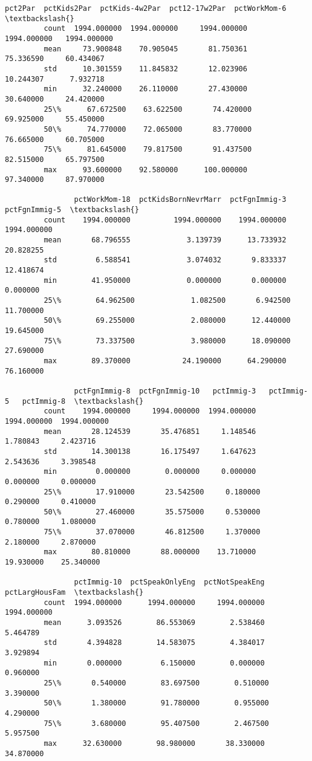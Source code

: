 \documentclass[11pt]{llncs}
\begin{document}
\begin{Verbatim}[commandchars=\\\{\}]
                    pct2Par  pctKids2Par  pctKids-4w2Par  pct12-17w2Par  pctWorkMom-6  \textbackslash{}
         count  1994.000000  1994.000000     1994.000000    1994.000000   1994.000000   
         mean     73.900848    70.905045       81.750361      75.336590     60.434067   
         std      10.301559    11.845832       12.023906      10.244307      7.932718   
         min      32.240000    26.110000       27.430000      30.640000     24.420000   
         25\%      67.672500    63.622500       74.420000      69.925000     55.450000   
         50\%      74.770000    72.065000       83.770000      76.665000     60.705000   
         75\%      81.645000    79.817500       91.437500      82.515000     65.797500   
         max      93.600000    92.580000      100.000000      97.340000     87.970000   
         
                pctWorkMom-18  pctKidsBornNevrMarr  pctFgnImmig-3  pctFgnImmig-5  \textbackslash{}
         count    1994.000000          1994.000000    1994.000000    1994.000000   
         mean       68.796555             3.139739      13.733932      20.828255   
         std         6.588541             3.074032       9.833337      12.418674   
         min        41.950000             0.000000       0.000000       0.000000   
         25\%        64.962500             1.082500       6.942500      11.700000   
         50\%        69.255000             2.080000      12.440000      19.645000   
         75\%        73.337500             3.980000      18.090000      27.690000   
         max        89.370000            24.190000      64.290000      76.160000   
         
                pctFgnImmig-8  pctFgnImmig-10   pctImmig-3   pctImmig-5   pctImmig-8  \textbackslash{}
         count    1994.000000     1994.000000  1994.000000  1994.000000  1994.000000   
         mean       28.124539       35.476851     1.148546     1.780843     2.423716   
         std        14.300138       16.175497     1.647623     2.543636     3.398548   
         min         0.000000        0.000000     0.000000     0.000000     0.000000   
         25\%        17.910000       23.542500     0.180000     0.290000     0.410000   
         50\%        27.460000       35.575000     0.530000     0.780000     1.080000   
         75\%        37.070000       46.812500     1.370000     2.180000     2.870000   
         max        80.810000       88.000000    13.710000    19.930000    25.340000   
         
                pctImmig-10  pctSpeakOnlyEng  pctNotSpeakEng  pctLargHousFam  \textbackslash{}
         count  1994.000000      1994.000000     1994.000000     1994.000000   
         mean      3.093526        86.553069        2.538460        5.464789   
         std       4.394828        14.583075        4.384017        3.929894   
         min       0.000000         6.150000        0.000000        0.960000   
         25\%       0.540000        83.697500        0.510000        3.390000   
         50\%       1.380000        91.780000        0.955000        4.290000   
         75\%       3.680000        95.407500        2.467500        5.957500   
         max      32.630000        98.980000       38.330000       34.870000   
         

\end{Verbatim}
\end{document}
